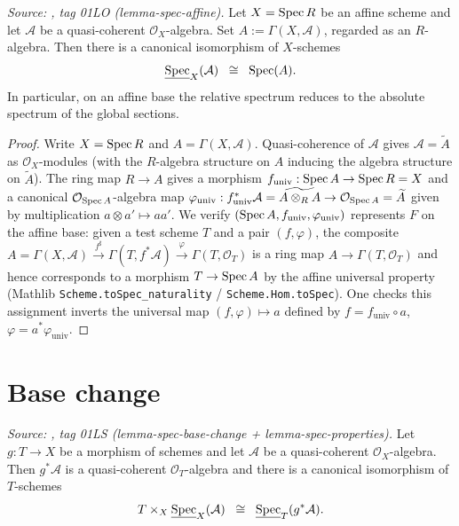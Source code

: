 \begin{theorem}
  \label{mk-thm:relative_spec_affine_base}
  \textit{Source: \cite{stacks-project}, tag 01LO (lemma-spec-affine).}
  Let \(X = \operatorname{Spec} R\) be an affine scheme and let \(\mathcal{A}\) be a quasi-coherent
  \(\mathcal{O}_X\)-algebra. Set \(A := \Gamma(X, \mathcal{A})\), regarded as an
  \(R\)-algebra. Then there is a canonical isomorphism of \(X\)-schemes
  \[
    \underline{\operatorname{Spec}}_X(\mathcal{A}) \;\;\cong\;\; \operatorname{Spec}(A).
  \]
  In particular, on an affine base the relative spectrum reduces to the absolute
  spectrum of the global sections.
\end{theorem}

\begin{proof}
  Write \(X = \operatorname{Spec} R\) and \(A = \Gamma(X, \mathcal{A})\). Quasi-coherence of
  \(\mathcal{A}\) gives \(\mathcal{A} = \widetilde{A}\) as \(\mathcal{O}_X\)-modules
  (with the \(R\)-algebra structure on \(A\) inducing the algebra structure on
  \(\widetilde A\)). The ring map \(R \to A\) gives a morphism
  \(f_{\mathrm{univ}} : \operatorname{Spec} A \to \operatorname{Spec} R = X\) and a canonical
  \(\mathcal{O}_{\operatorname{Spec} A}\)-algebra map
  $\varphi_{\mathrm{univ}} : f_{\mathrm{univ}}^* \mathcal{A} = \widetilde{A \otimes_R A}
  \to \mathcal{O}_{\operatorname{Spec} A} = \widetilde A$ given by multiplication
  \(a \otimes a' \mapsto aa'\). We verify \((\operatorname{Spec} A, f_{\mathrm{univ}}, \varphi_{\mathrm{univ}})\)
  represents \(F\) on the affine base: given a test scheme \(T\) and a pair
  \((f, \varphi)\), the composite
  $A = \Gamma(X, \mathcal{A}) \xrightarrow{f^\sharp}
  \Gamma(T, f^*\mathcal{A}) \xrightarrow{\varphi} \Gamma(T, \mathcal{O}_T)$
  is a ring map \(A \to \Gamma(T, \mathcal{O}_T)\) and hence corresponds to a morphism
  \(T \to \operatorname{Spec} A\) by the affine universal property
  (Mathlib \texttt{Scheme.toSpec\_naturality} /
  \texttt{Scheme.Hom.toSpec}). One checks this assignment inverts the universal map
  \((f, \varphi) \mapsto a\) defined by \(f = f_{\mathrm{univ}} \circ a\),
  \(\varphi = a^* \varphi_{\mathrm{univ}}\).
\end{proof}

\section{Base change}
\label{mk-sec:relspec_basechange}

\begin{theorem}
  \label{mk-thm:relative_spec_base_change}
  \textit{Source: \cite{stacks-project}, tag 01LS (lemma-spec-base-change +
  lemma-spec-properties).}
  Let \(g : T \to X\) be a morphism of schemes and let \(\mathcal{A}\) be a quasi-coherent
  \(\mathcal{O}_X\)-algebra. Then \(g^* \mathcal{A}\) is a quasi-coherent
  \(\mathcal{O}_T\)-algebra and there is a canonical isomorphism of \(T\)-schemes
  \[
    T \times_X \underline{\operatorname{Spec}}_X(\mathcal{A}) \;\;\cong\;\;
    \underline{\operatorname{Spec}}_T(g^* \mathcal{A}).
  \]
\end{theorem}

